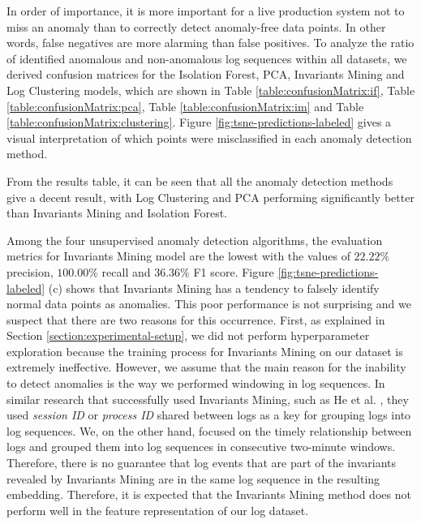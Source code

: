 In order of importance, it is more important for a live production system not to miss an anomaly than to correctly detect anomaly-free data points. In other words, false negatives are more alarming than false positives. To analyze the ratio of identified anomalous and non-anomalous log sequences within all datasets, we derived confusion matrices for the Isolation Forest, PCA, Invariants Mining and Log Clustering models, which are shown in Table \ref{table:confusionMatrix:if}, Table \ref{table:confusionMatrix:pca}, Table \ref{table:confusionMatrix:im} and Table \ref{table:confusionMatrix:clustering}. Figure \ref{fig:tsne-predictions-labeled} gives a visual interpretation of which points were misclassified in each anomaly detection method. 

From the results table, it can be seen that all the anomaly detection methods give a decent result, with Log Clustering and PCA performing significantly better than Invariants Mining and Isolation Forest.  

Among the four unsupervised anomaly detection algorithms, the evaluation metrics for Invariants Mining model are the lowest with the values of $22.22\%$ precision, $100.00\%$ recall and $36.36\%$ F1 score. Figure \ref{fig:tsne-predictions-labeled} (c) shows that Invariants Mining has a tendency to falsely identify normal data points as anomalies. This poor performance is not surprising and we suspect that there are two reasons for this occurrence. First, as explained in Section \ref{section:experimental-setup}, we did not perform hyperparameter exploration because the training process for Invariants Mining on our dataset is extremely ineffective. However, we assume that the main reason for the inability to detect anomalies is the way we performed windowing in log sequences. In similar research that successfully used Invariants Mining, such as He et al. \cite{he2016}, they used \textit{session ID } or \textit{process ID } shared between logs as a key for grouping logs into log sequences. We, on the other hand, focused on the timely relationship between logs and grouped them into log sequences in consecutive two-minute windows. Therefore, there is no guarantee that log events that are part of the invariants revealed by Invariants Mining are in the same log sequence in the resulting embedding. Therefore, it is expected that the Invariants Mining method does not perform well in the feature representation of our log dataset.

